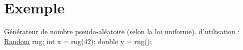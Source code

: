 \hypertarget{Exemple-example}{\section{Exemple}
}
Générateur de nombre pseudo-\/aléatoire (selon la loi uniforme). d'utilisation \+: \hyperlink{classRandom}{Random} rng; int x = rng(42); double y = rng();


\begin{DoxyCodeInclude}
\end{DoxyCodeInclude}
 